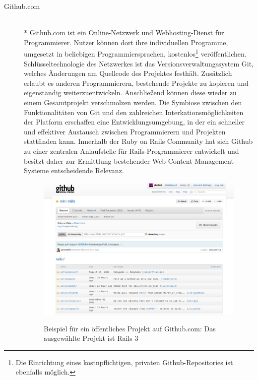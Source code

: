 \begin{description}
\newpage
\item[Github.com]\mbox{~}\\*
Github.com ist ein Online-Netzwerk und Webhosting-Dienst für Programmierer. Nutzer können dort ihre individuellen Programme, umgesetzt in beliebigen Programmiersprachen, kostenlos\footnote{Die Einrichtung eines kostnpflichtigen, privaten Github-Repositories ist ebenfalls möglich.}  veröffentlichen.
Schlüsseltechnologie des Netzwerkes ist das Versionsverwaltungssystem Git, welches Änderungen am Quellcode des Projektes festhält. Zusätzlich erlaubt es anderen Programmierern, bestehende Projekte zu kopieren und eigenständig weiterzuentwickeln. Anschließend können diese wieder zu einem Gesamtprojekt verschmolzen werden.
Die Symbiose zwischen den Funktionalitäten von Git und den zahlreichen Interkationsmöglichkeiten der Platform erschaffen eine Entwicklungsumgebung, in der ein schneller und effektiver Austausch zwischen Programmierern und Projekten stattfinden kann.
Innerhalb der Ruby on Rails Community hat sich Github zu einer zentralen Anlaufstelle für Rails-Programmierer entwickelt und besitzt daher zur Ermittlung bestehender Web Content Management Systeme entscheidende Relevanz.
\begin{figure}[!h]
\begin{center}
\label{fig.github}
\includegraphics[scale=0.3]{images/analyse/github/github.png}
\caption{Beispiel für ein öffentliches Projekt auf Github.com: Das ausgewählte Projekt ist Rails 3}
\end{center}
\end{figure}
\end{description}


\newpage
